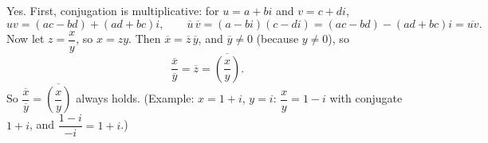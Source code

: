 Yes. First, conjugation is multiplicative: for $u=a+bi$ and $v=c+di$,
\[uv=(ac-bd)+(ad+bc)i,\qquad\overline{u}\,\overline{v}=(a-bi)(c-di)=(ac-bd)-(ad+bc)i=\overline{uv}.\]
Now let $z=\dfrac{x}{y}$, so $x=zy$. Then $\overline{x}=\overline{z}\,\overline{y}$, and $\overline{y}\ne0$ (because $y\ne0$), so
\[\dfrac{\overline{x}}{\overline{y}}=\overline{z}=\overline{\left(\dfrac{x}{y}\right)}.\]
So $\boxed{\dfrac{\overline{x}}{\overline{y}}=\overline{\left(\dfrac{x}{y}\right)}}$ always holds. (Example: $x=1+i$, $y=i$: $\dfrac{x}{y}=1-i$ with conjugate $1+i$, and $\dfrac{1-i}{-i}=1+i$.)
